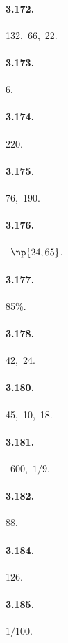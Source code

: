 \begin{multicols}{3}
\paragraph{3.172.} 132,~66,~22.

\paragraph{3.173.} 6.

\paragraph{3.174.} 220.

\paragraph{3.175.} 76,~190.

\paragraph{3.176.} \officialeuro~$\np{24,65}$.

\paragraph{3.177.} 85\%.

\paragraph{3.178.} 42,~24.

\paragraph{3.180.} 45,~10,~18.

\paragraph{3.181.} \officialeuro~$600$,~$1/9$.

\paragraph{3.182.} 88.

\paragraph{3.184.} 126.

\paragraph{3.185.} $1/100$.


\end{multicols}
